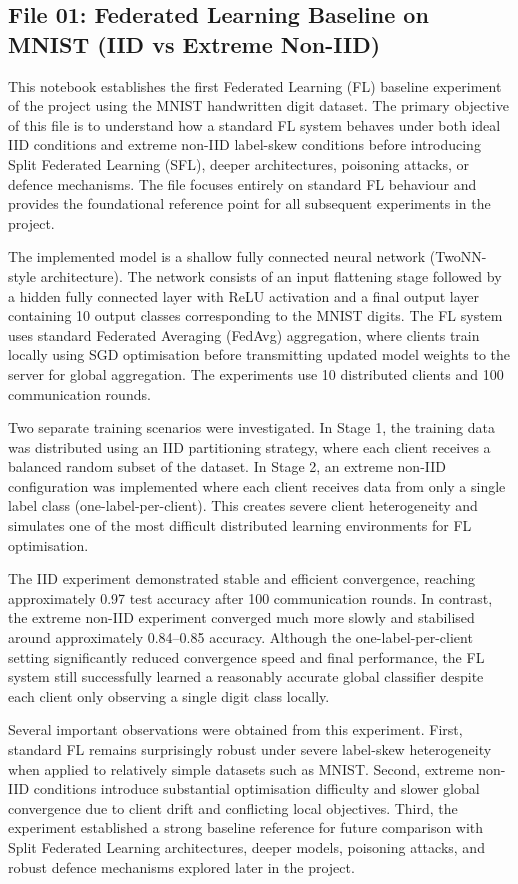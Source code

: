 \subsection*{File 01: Federated Learning Baseline on MNIST (IID vs Extreme Non-IID)}

This notebook establishes the first Federated Learning (FL) baseline experiment of the project using the MNIST handwritten digit dataset. The primary objective of this file is to understand how a standard FL system behaves under both ideal IID conditions and extreme non-IID label-skew conditions before introducing Split Federated Learning (SFL), deeper architectures, poisoning attacks, or defence mechanisms. The file focuses entirely on standard FL behaviour and provides the foundational reference point for all subsequent experiments in the project.

The implemented model is a shallow fully connected neural network (TwoNN-style architecture). The network consists of an input flattening stage followed by a hidden fully connected layer with ReLU activation and a final output layer containing 10 output classes corresponding to the MNIST digits. The FL system uses standard Federated Averaging (FedAvg) aggregation, where clients train locally using SGD optimisation before transmitting updated model weights to the server for global aggregation. The experiments use 10 distributed clients and 100 communication rounds.

Two separate training scenarios were investigated. In Stage 1, the training data was distributed using an IID partitioning strategy, where each client receives a balanced random subset of the dataset. In Stage 2, an extreme non-IID configuration was implemented where each client receives data from only a single label class (one-label-per-client). This creates severe client heterogeneity and simulates one of the most difficult distributed learning environments for FL optimisation.

The IID experiment demonstrated stable and efficient convergence, reaching approximately 0.97 test accuracy after 100 communication rounds. In contrast, the extreme non-IID experiment converged much more slowly and stabilised around approximately 0.84--0.85 accuracy. Although the one-label-per-client setting significantly reduced convergence speed and final performance, the FL system still successfully learned a reasonably accurate global classifier despite each client only observing a single digit class locally.

Several important observations were obtained from this experiment. First, standard FL remains surprisingly robust under severe label-skew heterogeneity when applied to relatively simple datasets such as MNIST. Second, extreme non-IID conditions introduce substantial optimisation difficulty and slower global convergence due to client drift and conflicting local objectives. Third, the experiment established a strong baseline reference for future comparison with Split Federated Learning architectures, deeper models, poisoning attacks, and robust defence mechanisms explored later in the project.

